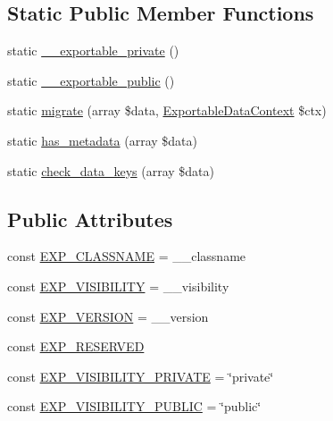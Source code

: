 \subsection*{Static Public Member Functions}
\begin{DoxyCompactItemize}
\item 
static \hyperlink{classlibresignage_1_1common_1_1php_1_1exportable_1_1Exportable_a29a45ff9807c7f7f803dd0d889741b28}{\+\_\+\+\_\+exportable\+\_\+private} ()
\item 
static \hyperlink{classlibresignage_1_1common_1_1php_1_1exportable_1_1Exportable_a573c81070e789ac70dacfd3d2b75d9bf}{\+\_\+\+\_\+exportable\+\_\+public} ()
\item 
static \hyperlink{classlibresignage_1_1common_1_1php_1_1exportable_1_1Exportable_af622ab4c65531a1dbd967caefcdc421c}{migrate} (array \$data, \hyperlink{classlibresignage_1_1common_1_1php_1_1exportable_1_1ExportableDataContext}{Exportable\+Data\+Context} \$ctx)
\item 
static \hyperlink{classlibresignage_1_1common_1_1php_1_1exportable_1_1Exportable_a21d53151e094979d8de5f84a82a9d837}{has\+\_\+metadata} (array \$data)
\item 
static \hyperlink{classlibresignage_1_1common_1_1php_1_1exportable_1_1Exportable_a9cd2d7bfa59939d26051103f4e620d8a}{check\+\_\+data\+\_\+keys} (array \$data)
\end{DoxyCompactItemize}
\subsection*{Public Attributes}
\begin{DoxyCompactItemize}
\item 
const \hyperlink{classlibresignage_1_1common_1_1php_1_1exportable_1_1Exportable_a0621c48253170af617e0ab468f212251}{E\+X\+P\+\_\+\+C\+L\+A\+S\+S\+N\+A\+ME} = \textquotesingle{}\+\_\+\+\_\+classname\textquotesingle{}
\item 
const \hyperlink{classlibresignage_1_1common_1_1php_1_1exportable_1_1Exportable_a4977db6db0eb6a9f931e363aa6c70271}{E\+X\+P\+\_\+\+V\+I\+S\+I\+B\+I\+L\+I\+TY} = \textquotesingle{}\+\_\+\+\_\+visibility\textquotesingle{}
\item 
const \hyperlink{classlibresignage_1_1common_1_1php_1_1exportable_1_1Exportable_a90cbc6d34faa2b604818cb123fc1e52c}{E\+X\+P\+\_\+\+V\+E\+R\+S\+I\+ON} = \textquotesingle{}\+\_\+\+\_\+version\textquotesingle{}
\item 
const \hyperlink{classlibresignage_1_1common_1_1php_1_1exportable_1_1Exportable_ab99b02b8f51cbfa93ea1fed28b613aef}{E\+X\+P\+\_\+\+R\+E\+S\+E\+R\+V\+ED}
\item 
const \hyperlink{classlibresignage_1_1common_1_1php_1_1exportable_1_1Exportable_a37e65f37adb6c4e0ff254ca55149eab3}{E\+X\+P\+\_\+\+V\+I\+S\+I\+B\+I\+L\+I\+T\+Y\+\_\+\+P\+R\+I\+V\+A\+TE} = \char`\"{}private\char`\"{}
\item 
const \hyperlink{classlibresignage_1_1common_1_1php_1_1exportable_1_1Exportable_a3dfc559147e6321a8134aeba53c514e0}{E\+X\+P\+\_\+\+V\+I\+S\+I\+B\+I\+L\+I\+T\+Y\+\_\+\+P\+U\+B\+L\+IC} = \char`\"{}public\char`\"{}
\end{DoxyCompactItemize}
